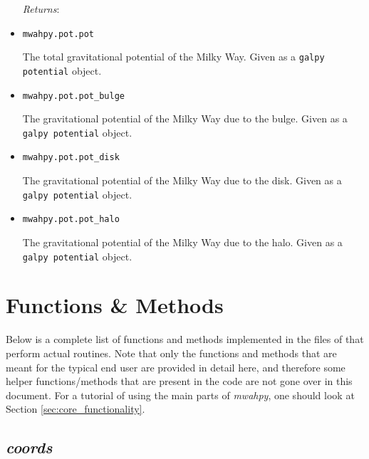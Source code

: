 \documentclass{article}
\begin{document}
\begin{itemize}
\textit{Returns}: 

\item \verb!mwahpy.pot.pot!

The total gravitational potential of the Milky Way. Given as a \verb!galpy potential! object. 

\item \verb!mwahpy.pot.pot_bulge!

The gravitational potential of the Milky Way due to the bulge. Given as a \verb!galpy potential! object. 

\item \verb!mwahpy.pot.pot_disk!

The gravitational potential of the Milky Way due to the disk. Given as a \verb!galpy potential! object. 

\item \verb!mwahpy.pot.pot_halo!

The gravitational potential of the Milky Way due to the halo. Given as a \verb!galpy potential! object. 

\end{itemize}

\newpage

\section{Functions \& Methods}

Below is a complete list of functions and methods implemented in the files of \mwahpy that perform actual routines. Note that only the functions and methods that are meant for the typical end user are provided in detail here, and therefore some helper functions/methods that are present in the code are not gone over in this document. For a tutorial of using the main parts of \textit{mwahpy}, one should look at Section \ref{sec:core_functionality}. 

\subsection{\textit{coords}} \label{sec:doc_coords}
\end{document}
